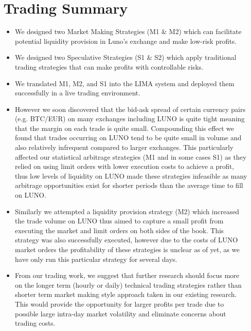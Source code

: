 \documentclass[12pt,a4paper]{article}
\begin{document}
\section{Trading Summary}
\begin{itemize}
\item We designed two Market Making Strategies (M1 \& M2) which can facilitate potential liquidity provision in Luno's exchange and make low-risk profits.
\item We designed two Speculative Strategies (S1 \& S2) which apply traditional trading strategies that can  make profits with controllable risks.
\item We translated M1, M2, and S1 into the LIMA system and deployed them successfully in a live trading environment.
\item However we soon discovered that the bid-ask spread of certain currency pairs (e.g. BTC/EUR) on many exchanges including LUNO is quite tight meaning that the margin on each trade is quite small. Compounding this effect we found that trades occurring on LUNO tend to be quite small in volume and also relatively infrequent compared to larger exchanges. This particularly affected our statistical arbitrage strategies (M1 and in some cases  S1) as they relied on using limit orders with lower execution costs to achieve a profit, thus low levels of liquidity on LUNO made these strategies infeasible as many arbitrage opportunities exist for shorter periods than the average time to fill on LUNO.

\item Similarly we attempted a liquidity provision strategy (M2) which increased the trade volume on LUNO thus aimed to capture a small profit from executing the market and limit orders on both sides of the book. This strategy was also successfully executed, however due to the costs of LUNO market orders the profitability of these strategies is unclear as of yet,  as we have only run this particular strategy for several days.

\item From our trading work, we suggest that further research should focus more on the longer term (hourly or daily) technical trading strategies rather than shorter term market making style approach taken in our existing research. This would provide the opportunity for larger profits per trade due to possible large intra-day market volatility and eliminate concerns about trading costs.

\end{itemize}
\end{document}
